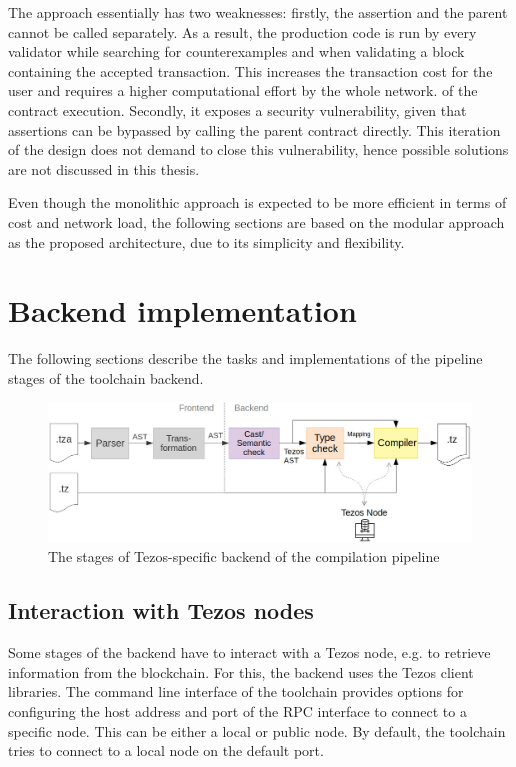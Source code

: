 The approach essentially has two weaknesses: firstly, the assertion and the parent cannot be called separately. As a result, the production code is run by every validator while searching for counterexamples and when validating a block containing the accepted transaction. This increases the transaction cost for the user and requires a higher computational effort by the whole network. of the contract execution. Secondly, it exposes a security vulnerability, given that assertions can be bypassed by calling the parent contract directly. This iteration of the design does not demand to close this vulnerability, hence possible solutions are not discussed in this thesis.

Even though the monolithic approach is expected to be more efficient in terms of cost and network load, the following sections are based on the modular approach as the proposed architecture, due to its simplicity and flexibility.

\section{Backend implementation}\label{sec:backend_impl}
The following sections describe the tasks and implementations of the pipeline stages of the toolchain backend.
\begin{figure}[h]
\includegraphics[width=\linewidth]{figures/5-offline_tezos/pipeline_backend}
\caption{The stages of Tezos-specific backend of the compilation pipeline}
\label{fig:pipeline_backend}
\end{figure}

\subsection{Interaction with Tezos nodes}
Some stages of the backend have to interact with a Tezos node, e.g. to retrieve information from the blockchain. For this, the backend uses the Tezos client libraries. The command line interface of the toolchain provides options for configuring the host address and port of the RPC interface to connect to a specific node. This can be either a local or public node. By default, the toolchain tries to connect to a local node on the default port.


